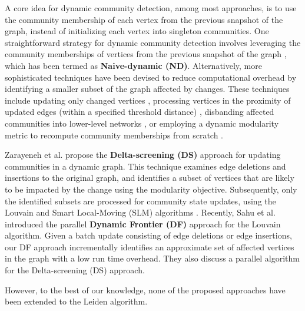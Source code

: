 A core idea for dynamic community detection, among most approaches, is to use the community membership of each vertex from the previous snapshot of the graph, instead of initializing each vertex into singleton communities. One straightforward strategy for dynamic community detection involves leveraging the community memberships of vertices from the previous snapshot of the graph \cite{com-aynaud10, com-chong13, com-shang14, com-zhuang19}, which has been termed as \textbf{Naive-dynamic (ND)}. Alternatively, more sophisticated techniques have been devised to reduce computational overhead by identifying a smaller subset of the graph affected by changes. These techniques include updating only changed vertices \cite{com-aktunc15, com-yin16}, processing vertices in the proximity of updated edges (within a specified threshold distance) \cite{com-held16}, disbanding affected communities into lower-level networks \cite{com-cordeiro16}, or employing a dynamic modularity metric to recompute community memberships from scratch \cite{com-meng16}.

Zarayeneh et al. \cite{com-zarayeneh21} propose the \textbf{Delta-screening (DS)} approach for updating communities in a dynamic graph. This technique examines edge deletions and insertions to the original graph, and identifies a subset of vertices that are likely to be impacted by the change using the modularity objective. Subsequently, only the identified subsets are processed for community state updates, using the Louvain and Smart Local-Moving (SLM) algorithms \cite{com-waltman13}. Recently, Sahu et al. \cite{sahu2024shared} introduced the parallel \textbf{Dynamic Frontier (DF)} approach for the Louvain algorithm. Given a batch update consisting of edge deletions or edge insertions, our DF approach incrementally identifies an approximate set of affected vertices in the graph with a low run time overhead. They also discuss a parallel algorithm for the Delta-screening (DS) approach.

However, to the best of our knowledge, none of the proposed approaches have been extended to the Leiden algorithm.
